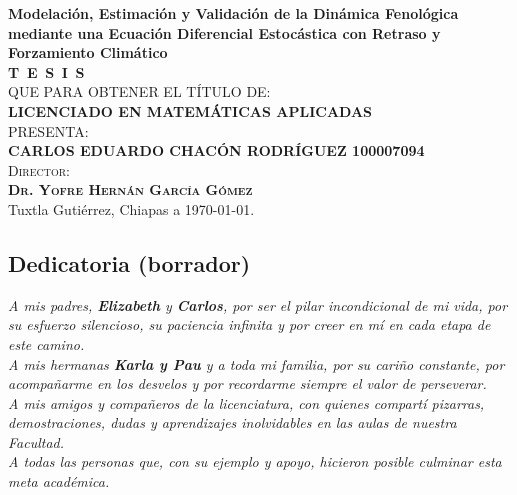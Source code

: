 \begin{titlepage}
\begin{minipage}[t][0.95\textheight][c]{0.76\textwidth}
            \begin{center}
                \vspace{0.7cm}
                {\Large\bfseries Modelación, Estimación y Validación de la Dinámica Fenológica mediante una Ecuación Diferencial Estocástica con Retraso y Forzamiento Climático}\\[2cm]
                \textsc{\huge \textbf{T\, E\, S\, I\, S}}\\[1.5cm]
                \textsc{\large QUE PARA OBTENER EL TÍTULO DE:}\\[0.3cm]
                \textbf{\textsc{LICENCIADO EN MATEMÁTICAS APLICADAS}}\\[1.5cm]
                \textsc{\large PRESENTA:}\\[0.3cm]
                \textbf{\textsc{\large {CARLOS EDUARDO CHACÓN RODRÍGUEZ 100007094}}}\\[2cm]
                {\large\scshape Director:\\[0.3cm]
                {\textbf{\large Dr. Yofre Hernán García Gómez }}}\\[2.0cm]
                \large{Tuxtla Gutiérrez, Chiapas a \today.}

            \end{center}
\end{minipage}
\end{titlepage}


\cleardoublepage
\thispagestyle{empty}
\vspace*{3cm}
\begin{flushright}
\begin{minipage}{0.78\textwidth}
\section*{Dedicatoria (borrador)}
\vspace{0.6cm}
\itshape
A mis padres, \textbf{Elizabeth} y \textbf{Carlos}, por ser el pilar incondicional de mi vida, por su esfuerzo silencioso, su paciencia infinita y por creer en mí en cada etapa de este camino.\\[0.5cm]

A mis hermanas \textbf{Karla y Pau} y a toda mi familia, por su cariño constante, por acompañarme en los desvelos y por recordarme siempre el valor de perseverar.\\[0.5cm]

A mis amigos y compañeros de la licenciatura, con quienes compartí pizarras, demostraciones, dudas y aprendizajes inolvidables en las aulas de nuestra Facultad.\\[0.5cm]

A todas las personas que, con su ejemplo y apoyo, hicieron posible culminar esta meta académica.
\end{minipage}
\end{flushright}

